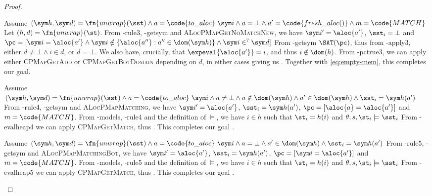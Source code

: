\begin{proof}
\begin{hypvlist}
 Assume $(\sym h,\sym d)=\fn{unwrap}(\sst) \land a = \code{to\_aloc}~\sym i \land a = \bot \land a'=\code{fresh\_aloc ()} \land m=\code{MATCH}$
 Let $(h,d)=\fn{unwrap}(\st)$.%
 From \hyp{rule3}, \hyp{getsym} and \textsc{ALocPMapGetNoMatchNew}, we have $\sym i'=\aloc{a'}$, $\sst_i=\bot$ and ${\pc=[\sym i=\aloc{a'} \land \sym i\notin\{\aloc{a''}:a''\in \dom(\sym h)\} \land \sym i \in^? \sym d]}$%
 From \hyp{getsym} $\SAT(\pc)$, thus from \hyp{apply3}, either $d\neq\bot\land i\in d$, or $d=\bot$. We also have, crucially, that $\expeval{\aloc{a'}}=i$, and thus $i\notin \dom(h)$.
 From \hyp{pctrue3}, we can apply either \textsc{CPMapGetAdd} or \textsc{CPMapGetBotDomain} depending on $d$, in either cases giving us . Together with \ref{eq:empty-mem}, this completes our goal.
\end{hypvlist}


\begin{hypvlist}
 Assume $(\sym h,\sym d)=\fn{unwrap}(\sst) \land a = \code{to\_aloc}~\sym i \land a \neq\bot \land a\notin \dom(\sym h) \land {a'\in\dom(\sym h)} \land \sst_i=\sym h(a')$
 From \hyp{rule4}, \hyp{getsym} and \textsc{ALocPMapMatching}, we have $\sym i'=\aloc{a'}$, $\sst_i=\sym h(a')$, ${\pc=[\aloc{a}=\aloc{a'}]}$ and $m=\code{MATCH}$.
 From \hyp{models}, \hyp{rule4} and the definition of $\models$, we have $i\in h$ such that $\st_i=h(i)$ and ${\theta,s,\st_i\models\sst_i}$
 From \hyp{evalheap4} we can apply \textsc{CPMapGetMatch}, thus . This completes our goal .
\end{hypvlist}


\begin{hypvlist}
 Assume $(\sym h,\sym d)=\fn{unwrap}(\sst) \land a = \code{to\_aloc}~\sym i \land a=\bot \land a'\in\dom(\sym h) \land \sst_i=\sym h(a')$%
 From \hyp{rule5}, \hyp{getsym} and \textsc{ALocPMapMatchingBot}, we have $\sym i'=\aloc{a'}$, $\sst_i=\sym h(a')$, ${\pc=[\sym i=\aloc{a'}]}$ and $m=\code{MATCH}$.
 From \hyp{models}, \hyp{rule5} and the definition of $\models$, we have $i\in h$ such that $\st_i=h(i)$ and ${\theta,s,\st_i\models\sst_i}$
 From \hyp{evalheap5} we can apply \textsc{CPMapGetMatch}, thus . This completes our goal .
\end{hypvlist}

\end{proof}



